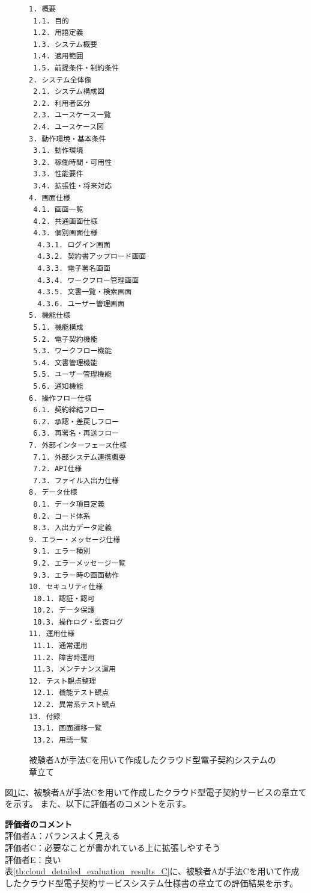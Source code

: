 \begin{figure}[tp]
\begin{tcolorbox}[
  colback=white,
  colframe=orange,
  fonttitle=\bfseries
]
\begin{multicols}{2}
\footnotesize
\ttfamily
\fontsize{8}{9}\selectfont
\begin{verbatim}
1. 概要
 1.1. 目的
 1.2. 用語定義
 1.3. システム概要
 1.4. 適用範囲
 1.5. 前提条件・制約条件
2. システム全体像
 2.1. システム構成図
 2.2. 利用者区分
 2.3. ユースケース一覧
 2.4. ユースケース図
3. 動作環境・基本条件
 3.1. 動作環境
 3.2. 稼働時間・可用性
 3.3. 性能要件
 3.4. 拡張性・将来対応
4. 画面仕様
 4.1. 画面一覧
 4.2. 共通画面仕様
 4.3. 個別画面仕様
  4.3.1. ログイン画面
  4.3.2. 契約書アップロード画面
  4.3.3. 電子署名画面
  4.3.4. ワークフロー管理画面
  4.3.5. 文書一覧・検索画面
  4.3.6. ユーザー管理画面
5. 機能仕様
 5.1. 機能構成
 5.2. 電子契約機能
 5.3. ワークフロー機能
 5.4. 文書管理機能
 5.5. ユーザー管理機能
 5.6. 通知機能
6. 操作フロー仕様
 6.1. 契約締結フロー
 6.2. 承認・差戻しフロー
 6.3. 再署名・再送フロー
7. 外部インターフェース仕様
 7.1. 外部システム連携概要
 7.2. API仕様
 7.3. ファイル入出力仕様
8. データ仕様
 8.1. データ項目定義
 8.2. コード体系
 8.3. 入出力データ定義
9. エラー・メッセージ仕様
 9.1. エラー種別
 9.2. エラーメッセージ一覧
 9.3. エラー時の画面動作
10. セキュリティ仕様
 10.1. 認証・認可
 10.2. データ保護
 10.3. 操作ログ・監査ログ
11. 運用仕様
 11.1. 通常運用
 11.2. 障害時運用
 11.3. メンテナンス運用
12. テスト観点整理
 12.1. 機能テスト観点
 12.2. 異常系テスト観点
13. 付録
 13.1. 画面遷移一覧
 13.2. 用語一覧
\end{verbatim}
\end{multicols}
\end{tcolorbox}
\caption{被験者Aが手法Cを用いて作成したクラウド型電子契約システムの章立て}
\label{fig:C_chapter_structure_of_cloud_contract_system_1}
\end{figure}

図\ref{fig:C_chapter_structure_of_cloud_contract_system_1}に、被験者Aが手法Cを用いて作成したクラウド型電子契約サービスの章立てを示す。
また、以下に評価者のコメントを示す。

\noindent\textbf{評価者のコメント}\\
評価者A：バランスよく見える\\
評価者C：必要なことが書かれている上に拡張しやすそう\\
評価者E：良い\\

表\ref{tb:cloud_detailed_evaluation_results_C}に、被験者Aが手法Cを用いて作成したクラウド型電子契約サービスシステム仕様書の章立ての評価結果を示す。

